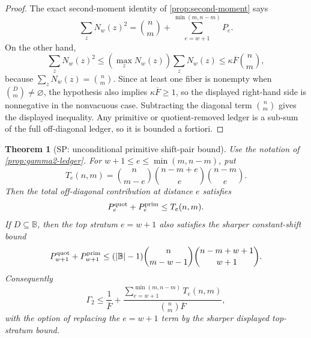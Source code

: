 \documentclass[a4paper,11pt]{amsart}
\newtheorem{theorem}{Theorem}[section]
\theoremstyle{remark}
\newcommand{\B}{\mathbb B}
\begin{document}
\begin{proof}
The exact second-moment identity of \cref{prop:second-moment} says
\[
        \sum_z N_w(z)^2
        =\binom nm+
        \sum_{e=w+1}^{\min(m,n-m)}P_e .
\]
On the other hand,
\[
        \sum_zN_w(z)^2
        \le (\max_zN_w(z))\sum_zN_w(z)
        \le \kappa\overline F\binom nm,
\]
because \(\sum_zN_w(z)=\binom nm\).  Since at least one fiber is nonempty when \(\binom Dm\ne\varnothing\), the hypothesis also implies \(\kappa\overline F\ge1\), so the displayed right-hand side is nonnegative in the nonvacuous case.  Subtracting the diagonal term \(\binom nm\) gives the displayed inequality.  Any primitive or quotient-removed ledger is a sub-sum of the full off-diagonal ledger, so it is bounded a fortiori.
\end{proof}

\begin{theorem}[SP: unconditional primitive shift-pair bound]\label{thm:sp-proper}
Use the notation of \cref{prop:gamma2-ledger}.  For \(w+1\le e\le\min(m,n-m)\), put
\[
        T_e(n,m)=\binom n{m-e}\binom{n-m+e}{e}\binom{n-m}{e}.
\]
Then the total off-diagonal contribution at distance \(e\) satisfies
\[
        P_e^{\rm quot}+P_e^{\rm prim}\le T_e(n,m).
\]
If \(D\subseteq\B\), then the top stratum \(e=w+1\) also satisfies the sharper constant-shift bound
\[
        P_{w+1}^{\rm quot}+P_{w+1}^{\rm prim}
        \le
        (|\B|-1)\binom n{m-w-1}\binom{n-m+w+1}{w+1}.
\]
Consequently
\[
        \Gamma_2
        \le
        \frac{1}{\overline F}
        +\frac{\sum_{e=w+1}^{\min(m,n-m)}T_e(n,m)}{\binom{n}{m}\overline F},
\]
with the option of replacing the \(e=w+1\) term by the sharper displayed top-stratum bound.
\end{theorem}
\end{document}
